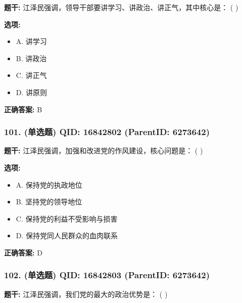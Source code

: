 \documentclass[12pt,UTF8]{ctexart}
\begin{document}
\textbf{题干:}
江泽民强调，领导干部要讲学习、讲政治、讲正气，其中核心是： ( )



\textbf{选项:}
\begin{itemize}[leftmargin=*]

  \item A. 讲学习

  \item B. 讲政治

  \item C. 讲正气

  \item D. 讲原则

\end{itemize}

\textbf{正确答案:}
B

\vspace{0.3em}\hrulefill\vspace{0.7em}

\subsubsection*{101. (单选题) \small QID: 16842802 (ParentID: 6273642)}

\textbf{题干:}
江泽民强调，加强和改进党的作风建设，核心问题是： ( )



\textbf{选项:}
\begin{itemize}[leftmargin=*]

  \item A. 保持党的执政地位

  \item B. 坚持党的领导地位

  \item C. 保持党的利益不受影响与损害

  \item D. 保持党同人民群众的血肉联系

\end{itemize}

\textbf{正确答案:}
D

\vspace{0.3em}\hrulefill\vspace{0.7em}

\subsubsection*{102. (单选题) \small QID: 16842803 (ParentID: 6273642)}

\textbf{题干:}
江泽民强调，我们党的最大的政治优势是： ( )
\end{document}
